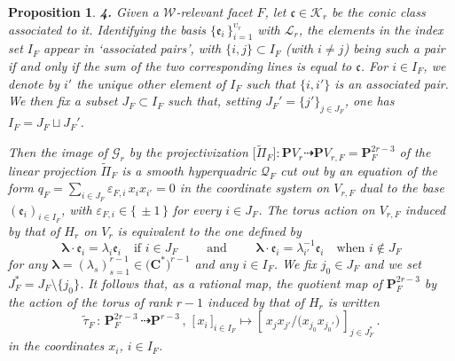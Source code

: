 \documentclass[11pt]{amsart}
\newcommand{\sk}{\smallskip}
\newtheorem{prop}[thm]{Proposition}
\begin{document}
\begin{prop}
\noindent 
{\bf 4.} Given a $\mathcal W$-relevant facet $F$, let $\boldsymbol{\mathfrak c}\in 
\boldsymbol{\mathcal K}_r$
be the conic class associated to it. 
Identifying the basis $\{ \mathfrak e_i\,\}_{i=1}^{\upsilon_r}$ with $\boldsymbol{\mathcal L}_r$, the elements in the index set $I_F$ appear in {\it `associated pairs'}, with $\{i,j\}\subset I_F$ (with $i\neq j$) being such a pair  if and only if the sum of the two corresponding lines is equal to $\boldsymbol{\mathfrak c}$. For $i\in I_F$, we denote by $i'$ the unique other element of $I_F$ such that $\{i,i'\}$ is an associated pair. 
We then fix a subset \( J_F \subset I_F \) such that, setting $J_F'=\{j'\}_{j\in J_F}$, one has $I_F=J_F\sqcup J_F'$.


Then the image of $\boldsymbol{\mathcal G}_r$ by the projectivization $\big[ \tilde \Pi_F\big]: \mathbf PV_r\dashrightarrow 
\mathbf PV_{r,F}=\mathbf P^{2r-3}_F$ of the linear projection 
$ \tilde \Pi_F$ 
 is a smooth hyperquadric $\boldsymbol{\mathcal Q}_F$ cut out by an equation of the form 
$q_F=\sum_{i\in J_F} \varepsilon_{F,i}\,x_i x_{i'}=0$ in the coordinate system on 
$V_{r,F}$ dual to the base $(\mathfrak e_i)_{i\in I_F}$, with $\varepsilon_{F,i}\in \{\,\pm1\,\}$ for every $i\in J_F$. The torus action  on $V_{r,F}$ 
induced by that of $H_r$ on $V_{r}$ is equivalent to the  one defined by  
$$
\boldsymbol{\lambda}\cdot \mathfrak e_i= \lambda_i \mathfrak e_i \quad \mbox{if } i\in J_F \qquad \mbox{ and  } \qquad 
\boldsymbol{\lambda}\cdot \mathfrak e_i= \lambda_{i'}^{-1} \mathfrak e_i\quad \mbox{when } i\not \in J_F
$$
for any $\boldsymbol{\lambda}=(\lambda_s)_{s=1}^{r-1}
\in \big(\mathbf C^*\big)^{r-1}$ and any $i\in I_F$. 
We fix $j_0\in J_F$ and we set $J_F^*=J_F\setminus \{j_0\}$. 
It follows that, as a rational map, 
the quotient map of $\mathbf P^{2r-3}_F$ by the action of the torus of rank $r-1$ induced by that of $H_r$ is written
\begin{equation} %
\label{Eq:Tilde-tau-F-r}%
 \tilde \tau_F \, :\,  \mathbf P^{2r-3}_F  \, \dashrightarrow \mathbf P^{r-3}\, , \,\, 
\big[\,x_i\,\big]_{i\in I_F}  \longmapsto \left[\, {x_{j}x_{j'}}/\big({x_{j_0}x_{j_0'}} \big)\,\right]_{j\in J_{F}^*}\, .
 \end{equation}
 in the coordinates $x_i$, $i\in I_F$. 
\sk



\end{prop}
\end{document}
